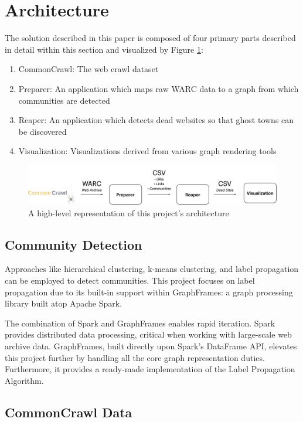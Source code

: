 \documentclass[conference]{IEEEtran}
\begin{document}
\section{Architecture}

The solution described in this paper is composed of four primary parts described in detail within this section and visualized by Figure \ref{fig:architecture}:
\begin{enumerate}
	\item CommonCrawl: The web crawl dataset
	\item Preparer: An application which maps raw WARC data to a graph from which communities are detected
	\item Reaper: An application which detects dead websites so that ghost towns can be discovered
	\item Visualization: Visualizations derived from various graph rendering tools
\end{enumerate}

\begin{figure}[htbp]
 \centerline{\includegraphics[width=\textwidth]{Architecture.png}}
 \caption{A high-level representation of this project's architecture}
 \label{fig:architecture}
\end{figure}

\subsection{Community Detection}

Approaches like hierarchical clustering, k-means clustering, and label propagation can be employed to detect communities. This project focuses on label propagation due to its built-in support within GraphFrames: a graph processing library built atop Apache Spark.

The combination of Spark and GraphFrames enables rapid iteration. Spark provides distributed data processing, critical when working with large-scale web archive data. GraphFrames, built directly upon Spark's DataFrame API, elevates this project further by handling all the core graph representation duties. Furthermore, it provides a ready-made implementation of the Label Propagation Algorithm.

\subsection{CommonCrawl Data}
\end{document}
